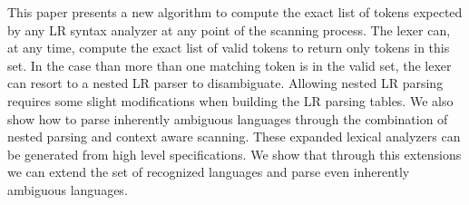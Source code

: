 This paper presents a new algorithm 
to compute the exact list of tokens 
expected by any LR syntax analyzer at any point of the scanning process.
The lexer can, at any time, compute the exact list of valid
tokens to return only tokens in this set.
In the case than more than one matching token is in the valid set, the lexer 
can resort to a nested LR parser to disambiguate.
Allowing nested LR parsing requires some slight modifications when building
the LR parsing tables.  
We also show  how
to parse inherently 
ambiguous languages through the
combination of nested parsing and context aware scanning.
These expanded lexical analyzers can be generated from high
level specifications.
We  show that through this extensions we can  extend the set of recognized languages
and parse even inherently ambiguous languages.



